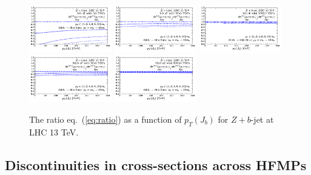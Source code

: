 \documentclass[letter,11pt]{article}
\begin{document}
%
%
\begin{figure}[t]
\centering
\includegraphics[trim=0.45cm 0.0cm 0.5cm 0.1cm,clip,width=0.32\textwidth]{./zbj_mubdep_lo_lopdfs.pdf}
\includegraphics[trim=0.45cm 0.0cm 0.5cm 0.1cm,clip,width=0.32\textwidth]{./zbj_mubdep_lo_nlopdfs.pdf}
\includegraphics[trim=0.45cm 0.0cm 0.5cm 0.1cm,clip,width=0.32\textwidth]{./zbj_mubdep_lo_nnlopdfs.pdf} \\
\vskip -3.6mm
\hskip 51mm
\includegraphics[trim=0.45cm 0.0cm 0.5cm 0.1cm,clip,width=0.32\textwidth]{./zbj_mubdep_nlo_nlopdfs.pdf}
\includegraphics[trim=0.45cm 0.0cm 0.5cm 0.1cm,clip,width=0.32\textwidth]{./zbj_mubdep_nlo_nnlopdfs.pdf} \\
\vskip -2mm
\caption{The ratio eq.~(\ref{eq:ratio}) as a function of $p_T(J_b)$ for $Z+b$-jet at LHC 13 TeV.}
\label{fig:zbj-mub-dep}
\end{figure}
%





\subsection{Discontinuities in cross-sections across HFMPs}
\end{document}
